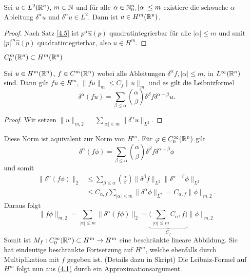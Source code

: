 \documentclass{mycourse}
\renewcommand{\eqref}[1]{\hyperref[#1]{(#1)}}
\begin{document}
\begin{st}\label{4.6}
Sei $u\in L^2(\mathbb{R}^n)$, $m\in \mathbb{N}$ und für alle $\alpha\in \mathbb{N}_0^n, |\alpha|\le m$ existiere die schwache $\alpha$-Ableitung $\delta^\alpha u$ und $\delta^\alpha u\in L^2$. Dann ist $u\in H^m(\mathbb{R}^n)$.  
\end{st}
\begin{proof}
Nach Satz \ref{4.5} ist $p^\alpha \hat u(p)$ quadratintegrierbar für alle $|\alpha|\le m$ und smit $|p|^m \hat u(p)$ quadratintegrierbar, also $u\in H^m$.
\end{proof}

\begin{kor}\label{4.7}
$C_0^m(\mathbb{R}^n) \subset H^m(\mathbb{R}^n)$
\end{kor}

\begin{st}\label{4.8}
Sei $u\in H^m(\mathbb{R}^n)$, $f\in C^m(\mathbb{R}^n)$ wobei alle Ableitungen $\delta^\alpha f, |\alpha| \le m$, in $L^\infty(\mathbb{R}^n)$ sind. Dann gilt $fu \in H^m$,
$\|fu\|_m\le C_f \| u\|_m$ und es gilt die Leibnizformel
\[
\delta^\alpha(fu)=\sum_{\beta \le \alpha} \binom{\alpha}{\beta} \delta^\beta f \delta^{\alpha- \beta} u.
\]
\end{st}
\begin{proof}
Wir setzen $\| u \|_{m,2}=\sum_{|\alpha| \le m} \| \delta^\alpha u\|_{L^2}$.
\end{proof}
Diese Norm ist äquivalent zur Norm von $H^m$. Für $\varphi \in C_0^\infty(\mathbb{R}^n)$ gilt
\begin{equation}\label{4.1}
\delta^\alpha(f\phi) = \sum_{\beta \le \alpha} \binom{\alpha}{\beta} \delta^\beta f \delta^{\alpha-\beta} \phi
\end{equation}
und somit
\begin{align*}
\|\delta^\alpha(f\phi) \|_2 &\le \sum_{\beta \le \alpha} \binom{\alpha}{\beta} \| \delta^\beta f\| _{L^2} \| \delta^{\alpha-\beta} \phi \|_{L^2}\\
&\le C_{\alpha,f} \sum_{|\alpha|\le m} \| \delta^\alpha \phi \|_{L^2}= C_{\alpha,f} \| \phi \|_{m,2}.
\end{align*}
Daraus folgt
\[
\|f\phi\|_{m,2}= \sum_{|\alpha|\le m} \| \delta^\alpha(f\phi)\|_2=\underbrace{\big(\sum_{|\alpha|\le m} C_\alpha,f\big) }_{C_f}  \|\phi\|_{m,2}
\]
Somit ist $M_f:C_0^\infty (\mathbb{R}^n) \subset H^m \to H^m$ eine beschränkte lineare Abbildung. Sie hat eindeutige beschränkte Fortsetzung auf $H^m$, welche ebenfalls durch  Multiplikation mit $f$ gegeben ist. (Details dazu in Skript) Die Leibniz-Formel auf $H^m$ folgt nun aus \eqref{4.1} durch ein Approximationsargument.
\end{document}
